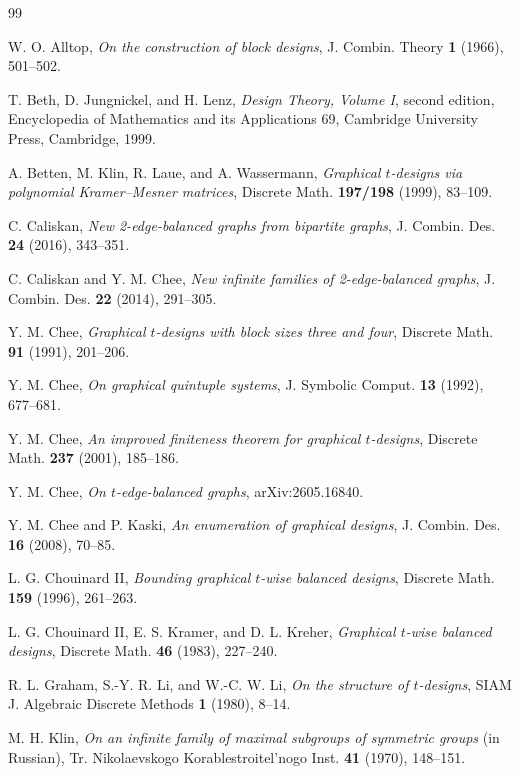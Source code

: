 \documentclass[12pt]{amsart}
\theoremstyle{definition}
\begin{document}
\begin{thebibliography}{99}

W. O. Alltop, \emph{On the construction of block designs}, J. Combin. Theory
\textbf{1} (1966), 501--502.

T. Beth, D. Jungnickel, and H. Lenz, \emph{Design Theory, Volume I}, second
edition, Encyclopedia of Mathematics and its Applications 69, Cambridge
University Press, Cambridge, 1999.

A. Betten, M. Klin, R. Laue, and A. Wassermann, \emph{Graphical $t$-designs
via polynomial Kramer--Mesner matrices}, Discrete Math. \textbf{197/198}
(1999), 83--109.

C. Caliskan, \emph{New 2-edge-balanced graphs from bipartite graphs}, J.
Combin. Des. \textbf{24} (2016), 343--351.

C. Caliskan and Y. M. Chee, \emph{New infinite families of 2-edge-balanced
graphs}, J. Combin. Des. \textbf{22} (2014), 291--305.

Y. M. Chee, \emph{Graphical $t$-designs with block sizes three and four},
Discrete Math. \textbf{91} (1991), 201--206.

Y. M. Chee, \emph{On graphical quintuple systems}, J. Symbolic Comput.
\textbf{13} (1992), 677--681.

Y. M. Chee, \emph{An improved finiteness theorem for graphical $t$-designs},
Discrete Math. \textbf{237} (2001), 185--186.

Y. M. Chee, \emph{On $t$-edge-balanced graphs}, arXiv:2605.16840.

Y. M. Chee and P. Kaski, \emph{An enumeration of graphical designs}, J.
Combin. Des. \textbf{16} (2008), 70--85.

L. G. Chouinard II, \emph{Bounding graphical $t$-wise balanced designs},
Discrete Math. \textbf{159} (1996), 261--263.

L. G. Chouinard II, E. S. Kramer, and D. L. Kreher, \emph{Graphical $t$-wise
balanced designs}, Discrete Math. \textbf{46} (1983), 227--240.

R. L. Graham, S.-Y. R. Li, and W.-C. W. Li, \emph{On the structure of
$t$-designs}, SIAM J. Algebraic Discrete Methods \textbf{1} (1980), 8--14.

M. H. Klin, \emph{On an infinite family of maximal subgroups of symmetric
groups} (in Russian), Tr. Nikolaevskogo Korablestroitel'nogo Inst.
\textbf{41} (1970), 148--151.


\end{thebibliography}
\end{document}
